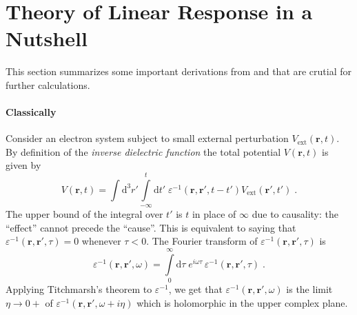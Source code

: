 \documentclass[a4paper,12pt]{article}
\begin{document}
\section{Theory of Linear Response in a Nutshell} \label{sec:linear_response}
    This section summarizes some important derivations from \cite{vonsovskiui1989quantum} and \cite{giuliani2005quantum} that are crutial for further calculations.
    \paragraph{Classically} Consider an electron system subject to small external perturbation $V_\text{ext}(\mathbf{r}, t)$. By definition of the \textit{inverse dielectric function} the total potential $V(\mathbf{r}, t)$ is given by
    \begin{equation} \label{eq:cl:potentials_t}
        V(\mathbf{r}, t) 
            = \int\!\! \text{d}^3 r' \!\! \int\limits_{-\infty}^{t}\!\! \text{d} t'\; \varepsilon^{-1}(\mathbf{r}, \mathbf{r'}, t - t') V_\text{ext}(\mathbf{r'}, t')\; .
    \end{equation}
    The upper bound of the integral over $t'$ is $t$ in place of $\infty$ due to causality: the ``effect'' cannot precede the ``cause''. This is equivalent to saying that $\varepsilon^{-1}(\mathbf{r}, \mathbf{r'}, \tau) = 0$ whenever $\tau < 0$. The Fourier transform of $\varepsilon^{-1}(\mathbf{r}, \mathbf{r'}, \tau)$ is
    \begin{equation} \label{eq:cl:inv_dielectric_w}
        \varepsilon^{-1}(\mathbf{r},\mathbf{r'},\omega) = \int\limits_{0}^{\infty} \!\! \text{d}\tau \; e^{i\omega \tau}\,\varepsilon^{-1}(\mathbf{r}, \mathbf{r'}, \tau)\; .
    \end{equation}
    Applying Titchmarsh's theorem to $\varepsilon^{-1}$, we get that $\varepsilon^{-1}(\mathbf{r}, \mathbf{r'}, \omega)$ is the limit $\eta \to 0+$ of $\varepsilon^{-1}(\mathbf{r}, \mathbf{r'}, \omega + i\eta)$ which is holomorphic in the upper complex plane.
\end{document}
